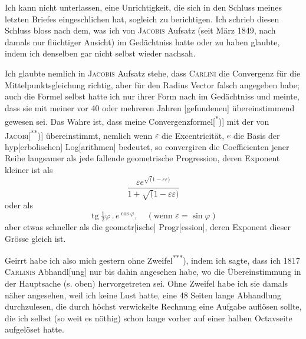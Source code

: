 \indent Ich kann nicht unterlassen, eine Unrichtigkeit, die sich in den Schluss meines letzten Briefes eingeschlichen hat, sogleich zu berichtigen. Ich schrieb diesen Schluss bloss nach dem, was ich von \textsc{Jacobis} Aufsatz (seit März 1849,
\clearpage{}
\noindent nach damals nur flüchtiger Ansicht) im Gedächtniss hatte oder zu haben glaubte, indem ich denselben gar nicht selbst wieder nachsah.

\indent Ich glaubte nemlich in \textsc{Jacobis} Aufsatz stehe, dass \textsc{Carlini} die Convergenz für die Mittelpunktsgleichung richtig, aber für den Radius Vector falsch angegeben habe; auch die Formel selbst hatte ich nur ihrer Form nach im Gedächtniss und meinte, dass sie mit meiner vor 40 oder mehreren Jahren [gefundenen] übereinstimmend gewesen sei. Das Wahre ist, dass meine Convergenzformel[\textsuperscript{*})] mit der von \textsc{Jacobi}[\textsuperscript{**})] übereinstimmt, nemlich wenn \(\varepsilon\) die Excentricität, \(e\) die Basis der hyp[erbolischen] Log[arithmen] bedeutet, so convergiren die Coefficienten jener Reihe langsamer als jede fallende geometrische Progression, deren Exponent kleiner ist als
\[
\frac{\varepsilon e^{\surd(1-\varepsilon\varepsilon)}}{1+\surd(1-\varepsilon\varepsilon)}
\]
\noindent oder als
\[
\operatorname{tg}\tfrac12\varphi\,{.}\,e^{\cos\varphi},\quad (\text{wenn }\varepsilon=\sin\varphi)
\]
\noindent aber etwas schneller als die geometr[ische] Progr[ession], deren Exponent dieser Grösse gleich ist.

\indent Geirrt habe ich also mich gestern ohne Zweifel\textsuperscript{***}), indem ich sagte, dass ich 1817 \textsc{Carlinis} Abhandl[ung] nur bis dahin angesehen habe, wo die Übereinstimmung in der Hauptsache (s. oben) hervorgetreten sei. Ohne Zweifel habe ich sie damals  näher angesehen, weil ich keine Lust hatte, eine 48 Seiten lange Abhandlung durchzulesen, die durch höchst verwickelte Rechnung eine Aufgabe auflösen sollte, die ich selbst (so weit es nöthig) schon lange vorher auf einer halben Octavseite aufgelöset hatte.

